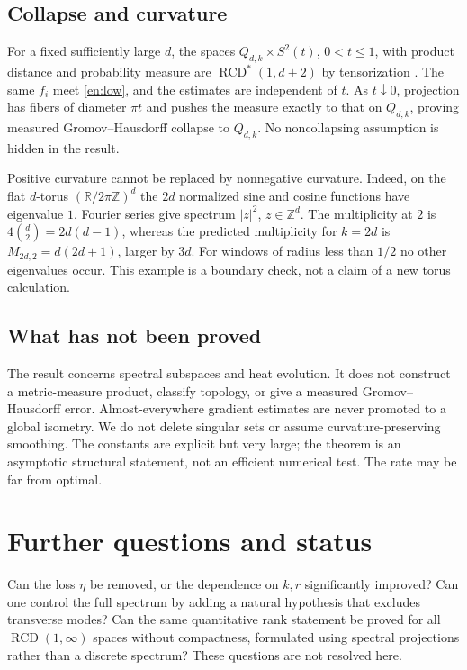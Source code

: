 \documentclass[12pt]{amsart}
\theoremstyle{definition}
\theoremstyle{remark}
\numberwithin{equation}{section}
\newcommand{\R}{\mathbb{R}}
\newcommand{\Z}{\mathbb{Z}}
\newcommand{\RCD}{\operatorname{RCD}^{*}}
\theoremstyle{plain}
\begin{document}
\subsection{Collapse and curvature}
For a fixed sufficiently large $d$, the spaces
$Q_{d,k}\times S^2(t)$, $0<t\leq1$, with product distance and probability
measure are $\RCD(1,d+2)$ by tensorization
\cite[Theorem 3.23]{en:EKS}. The same $f_i$ meet \eqref{en:low},
and the estimates are independent of $t$.
As $t\downarrow0$, projection has fibers of diameter $\pi t$ and
pushes the measure exactly to that on $Q_{d,k}$, proving measured
Gromov--Hausdorff collapse to $Q_{d,k}$. No noncollapsing assumption
is hidden in the result.

Positive curvature cannot be replaced by nonnegative curvature.
Indeed, on the flat $d$-torus $(\R/2\pi\Z)^d$ the $2d$ normalized
sine and cosine functions have eigenvalue $1$. Fourier series give
spectrum $|z|^2$, $z\in\Z^d$. The multiplicity at $2$ is
$4\binom d2=2d(d-1)$, whereas the predicted multiplicity for $k=2d$
is $M_{2d,2}=d(2d+1)$, larger by $3d$.
For windows of radius less than $1/2$ no other eigenvalues occur.
This example is a boundary check, not a claim of a new torus calculation.

\subsection{What has not been proved}
The result concerns spectral subspaces and heat evolution. It does not
construct a metric-measure product, classify topology, or give a measured
Gromov--Hausdorff error. Almost-everywhere gradient estimates are never
promoted to a global isometry. We do not delete singular sets or assume
curvature-preserving smoothing. The constants are explicit but very
large; the theorem is an asymptotic structural statement, not an efficient
numerical test. The rate may be far from optimal.

\section{Further questions and status}
Can the loss $\eta$ be removed, or the dependence on
$k,r$ significantly improved? Can one control the full spectrum by
adding a natural hypothesis that excludes transverse modes? Can the
same quantitative rank statement be proved for all
$\operatorname{RCD}(1,\infty)$ spaces without compactness, formulated
using spectral projections rather than a discrete spectrum?
These questions are not resolved here.
\end{document}
